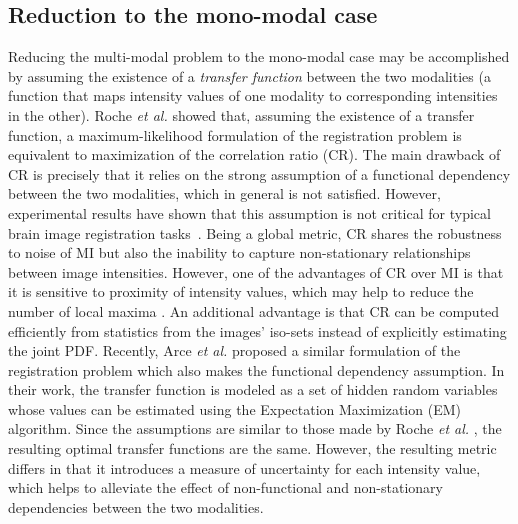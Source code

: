 \closer
\subsection{Reduction to the mono-modal case}
Reducing the multi-modal problem to the mono-modal case may be accomplished by assuming the existence of a {\it transfer function} between the two modalities (a function that maps intensity values of one modality to corresponding intensities in the other). Roche {\it et al.} \cite{Roche2000} showed that, assuming the existence of a transfer function, a maximum-likelihood formulation of the registration problem is equivalent to maximization of the correlation ratio (CR). The main drawback of CR is precisely that it relies on the strong assumption of a functional dependency between the two modalities, which in general is not satisfied. However, experimental results have shown that this assumption is not critical for typical brain image registration tasks~\citep{Roche1998}. Being a global metric, CR shares the robustness to noise of MI but also the inability to capture non-stationary relationships between image intensities. However, one of the advantages of CR over MI is that it is sensitive to proximity of intensity values, which may help to reduce the number of local maxima \citep{Roche1998}. An additional advantage is that CR can be computed efficiently from statistics from the images' iso-sets instead of explicitly estimating the joint PDF. Recently, Arce {\it et al.} \cite{Arce-santana2014} proposed a similar formulation of the registration problem which also makes the functional dependency assumption. In their work, the transfer function is modeled as a set of hidden random variables whose values can be estimated using the Expectation Maximization (EM) algorithm. Since the assumptions are similar to those made by Roche {\it et al.} \cite{Roche1998, Roche2000}, the resulting optimal transfer functions are the same. However, the resulting metric differs in that it introduces a measure of uncertainty for each intensity value, which helps to alleviate the effect of non-functional and non-stationary dependencies between the two modalities. 

